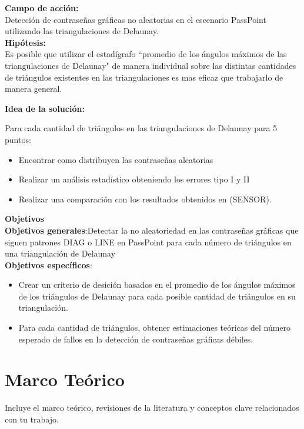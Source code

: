 \documentclass[12pt]{report}
\begin{document}
		   
	\large{\textbf{Campo de acción:}}\\
	\normalsize{Detección de contraseñas gráficas no aleatorias en el escenario PassPoint utilizando las triangulaciones de Delaunay}.\\
	 
	\large{\textbf{Hipótesis:}}\\
	\normalsize{Es posible que utilizar el estadígrafo ``promedio de los ángulos máximos de las triangulaciones de Delaunay"  de manera individual sobre las distintas cantidades de triángulos existentes en las triangulaciones es mas eficaz que trabajarlo de manera general.\\
	}	
	
	\large{\textbf{Idea de la solución:}}\\
	\normalsize{
		Para cada cantidad de triángulos  en las triangulaciones de Delaunay para 5 puntos:
		\begin{itemize}
			\item Encontrar como distribuyen las contraseñas aleatorias
			\item Realizar un análisis estadístico obteniendo los errores tipo I y II
			\item Realizar una comparación  con los resultados obtenidos en (SENSOR).
		
		\end{itemize}
	
	
	
	}
	
	\large{\textbf{Objetivos}}\\
	\normalsize{\textbf{Objetivos generales}}:Detectar\cite{1} la no aleatoriedad en las contraseñas gráficas que siguen patrones DIAG o LINE en PassPoint para cada número de triángulos en una triangulación de Delaunay\\
	\normalsize{\textbf{Objetivos específicos}}:
	\begin{itemize}
		\item Crear un criterio de desición basados en el promedio de los ángulos máximos de los triángulos de Delaunay para cada posible cantidad de triángulos en su triangulación.
		\item  Para cada cantidad de triángulos, obtener estimaciones teóricas del número esperado de fallos en la detección de contraseñas gráficas débiles.
	\end{itemize}
	
	
	

\setcounter{chapter}{0}
\chapter{Marco Teórico}
Incluye el marco teórico, revisiones de la literatura y conceptos clave relacionados con tu trabajo.
\end{document}

